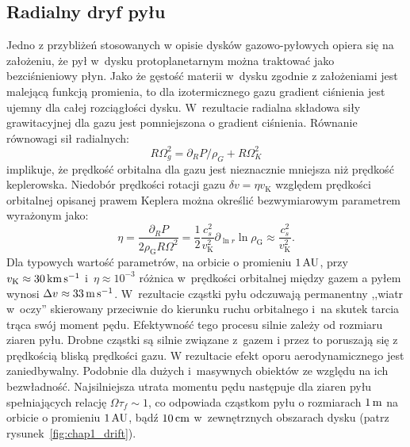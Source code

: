 \subsection{Radialny dryf pyłu}
Jedno z przybliżeń stosowanych w opisie dysków gazowo-pyłowych opiera się na
założeniu, że pył w~dysku protoplanetarnym można traktować jako bezciśnieniowy płyn. 
Jako że gęstość materii w~dysku zgodnie z założeniami jest malejącą funkcją
promienia, to dla izotermicznego gazu gradient ciśnienia jest ujemny dla całej
rozciągłości dysku. W~rezultacie radialna składowa siły grawitacyjnej dla gazu
jest pomniejszona o gradient ciśnienia. Równanie równowagi sił radialnych:
%
\begin{equation}
   R\Omega_g^2 = \partial_R P / \rho_G + R\Omega_K^2
\end{equation}
%
implikuje, że prędkość orbitalna dla gazu jest nieznacznie mniejsza niż prędkość
keplerowska. Niedobór prędkości rotacji gazu $\delta v = \eta v_\textrm{K}$
względem prędkości orbitalnej opisanej prawem Keplera można określić 
bezwymiarowym parametrem~\cite{N86} wyrażonym jako:
%
\begin{equation}
   \label{eq:eta}
   \eta = \frac{\partial_R P}{2\rho_\textrm{G} R \Omega^2} = \frac{1}{2}
   \frac{c_s^2}{v_\textrm{K}^2} \partial_{\ln r} \ln \rho_{\textrm{G}} \approx
   \frac{c_s^2}{v_\textrm{K}^2}.
\end{equation}
%
Dla typowych wartość parametrów, na orbicie o promieniu $1\hbox{$\thinspace\textrm{AU}$}$, przy
$v_\textrm{K}\approx 30\hbox{$\thinspace\textrm{km}$}\hbox{$\thinspace\textrm{s}$}^{-1}$ i~$\eta \approx 10^{-3}$ różnica w~prędkości
orbitalnej między gazem a pyłem wynosi $\Delta v \approx 33\hbox{$\thinspace\textrm{m}$}\hbox{$\thinspace\textrm{s}$}^{-1}$.
W~rezultacie cząstki pyłu odczuwają permanentny ,,wiatr w~oczy'' skierowany
przeciwnie do kierunku ruchu orbitalnego i~na skutek tarcia trąca swój moment
pędu. Efektywność tego procesu silnie zależy od rozmiaru ziaren pyłu. Drobne
cząstki są silnie związane z~gazem i przez to poruszają się z prędkością bliską
prędkości gazu. W rezultacie efekt oporu aerodynamicznego jest zaniedbywalny.
Podobnie dla dużych i~masywnych obiektów ze względu na ich bezwładność.
Najsilniejsza utrata momentu pędu następuje dla ziaren pyłu spełniających
relację $\Omega \tau_f \sim 1$, co odpowiada cząstkom pyłu o rozmiarach $1\hbox{$\thinspace\textrm{m}$}$ na
orbicie o promieniu $1\hbox{$\thinspace\textrm{AU}$}$, bądź $10\hbox{$\thinspace\textrm{cm}$}$ w~zewnętrznych obszarach dysku (patrz
rysunek~\ref{fig:chap1_drift}).
%
